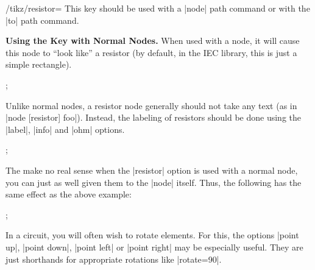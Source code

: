 \begin{key}{/tikz/resistor=}
    This key should be used with a |node| path command or with the |to| path
    command.

    \medskip\textbf{Using the Key with Normal Nodes.}
    When used with a node, it will cause this node to ``look like'' a resistor
    (by default, in the IEC library, this is just a simple rectangle).
\begin{codeexample}[preamble={\usetikzlibrary{circuits.ee.IEC}}]
  \node [resistor] {};
\end{codeexample}

    Unlike normal nodes, a resistor node generally should not take any text (as
    in |node [resistor] {foo}|). Instead, the labeling of resistors should be
    done using the |label|, |info| and |ohm| options.
\begin{codeexample}[preamble={\usetikzlibrary{circuits.ee.IEC}}]
  \node [resistor,ohm=5] {};
\end{codeexample}

    The  make no real sense when the |resistor| option is used
    with a normal node, you can just as well given them to the |node| itself.
    Thus, the following has the same effect as the above example:
\begin{codeexample}[preamble={\usetikzlibrary{circuits.ee.IEC}}]
  \node [resistor={ohm=5}] {};
\end{codeexample}

    In a circuit, you will often wish to rotate elements. For this, the options
    |point up|, |point down|, |point left| or |point right| may be especially
    useful. They are just shorthands for appropriate rotations like
    |rotate=90|.
\begin{codeexample}[preamble={\usetikzlibrary{circuits.ee.IEC}}]
\end{codeexample}


\end{key}

